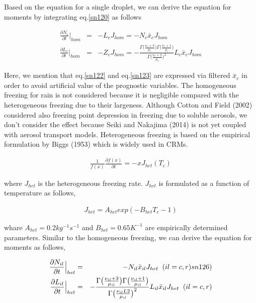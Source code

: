 Based on the equation for a single droplet, we can derive the equation for moments by integrating eq.\ref{sn120} as follows

\begin{eqnarray}
\frac{\partial N_{c}}{\partial t}\Bigr|_{hom}&=&-L_{c}J_{hom}=-N_{c}\bar{x}_{c}J_{hom}\label{sn122}\\
\frac{\partial L_{c}}{\partial t}\Bigr|_{hom}&=&-Z_{c}J_{hom}=-\frac{\Gamma\bigl(\frac{\nu_{c}+3}{\mu_{c}}\bigr)\Gamma\bigl(\frac{\nu_{c}+1}{\mu_{c}}\bigr)}{\Gamma\bigl(\frac{\nu_{c}+2}{\mu_{c}}\bigr)^{2}}L_{c}\bar{x}_{c}J_{hom}\label{sn123}
\end{eqnarray}

Here, we mention that eq.\ref{sn122} and eq.\ref{sn123} are expressed via filtered $\bar{x}_{c}$ in order to avoid artificial value of the prognostic variables. The homogeneous freezing for rain is not considered because it is negligible compared with the heterogeneous freezing due to their largeness. Although Cotton and Field (2002) considered also freezing point depression in freezing due to soluble aerosols, we don’t consider the effect because Seiki and Nakajima (2014) is not yet coupled with aerosol transport models.
Heterogeneous freezing is based on the empirical formulation by Biggs (1953) which is widely used in CRMs.

\begin{eqnarray}
\frac{1}{f(x)}\frac{\partial f(x)}{\partial t}=-xJ_{het}(T_{c})\label{sn124}
\end{eqnarray}

where $J_{het}$ is the heterogeneous freezing rate. $J_{het}$ is formulated as a function of temperature as follows,

\begin{eqnarray}
J_{het}=A_{het}exp(-B_{het}T_{c}-1)\label{sn125}
\end{eqnarray}

whare $A_{het}=0.2kg^{-1}s^{-1}$ and $B_{het}=0.65K^{-1}$ are empirically determined parameters. Similar to the homogeneous freezing, we can derive the equation for moments as follows,

\begin{eqnarray}
\frac{\partial N_{il}}{\partial t}\Bigr|_{het}&=&-N_{il}\bar{x}_{il}J_{het}\;\;(il=c,r)\label(sn126)\\
\frac{\partial L_{il}}{\partial t}\Bigr|_{het}&=&-\frac{\Gamma\bigl(\frac{\nu_{il}+3}{\mu_{il}}\bigr)\Gamma\bigl(\frac{\nu_{il}+1}{\mu_{il}}\bigr)}{\Gamma\bigl(\frac{\nu_{il}L2}{\mu_{il}}\bigr)^{2}}L_{il}\bar{x}_{il}J_{het}\;\;(il=c,r)\label{sn127}
\end{eqnarray}

